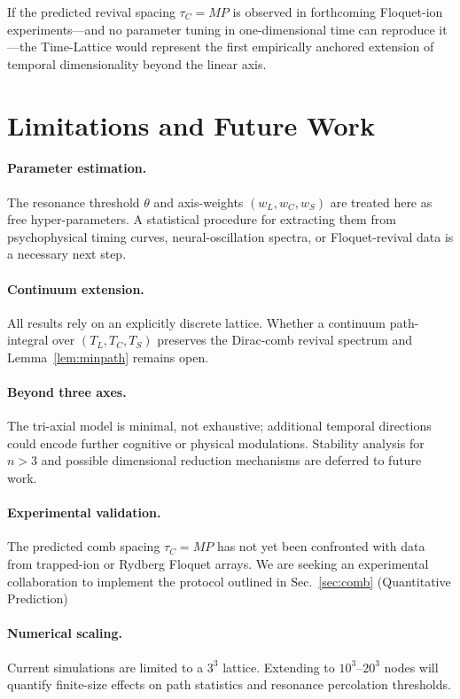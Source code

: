 \documentclass[11pt]{article}
\begin{document}
If the predicted revival spacing $\tau_C=MP$ is observed in forthcoming
Floquet-ion experiments—and no parameter tuning in one-dimensional time
can reproduce it—the Time-Lattice would represent the first empirically
anchored extension of temporal dimensionality beyond the linear axis.

\section{Limitations and Future Work}\label{sec:limits}

\paragraph{Parameter estimation.}
The resonance threshold $\theta$ and axis-weights $(w_L,w_C,w_S)$ are
treated here as free hyper-parameters.  A statistical procedure for
extracting them from psychophysical timing curves, neural-oscillation
spectra, or Floquet-revival data is a necessary next step.

\paragraph{Continuum extension.}
All results rely on an explicitly discrete lattice.
Whether a continuum path-integral over $(T_L,T_C,T_S)$ preserves the
Dirac-comb revival spectrum and Lemma~\ref{lem:minpath} remains open.

\paragraph{Beyond three axes.}
The tri-axial model is minimal, not exhaustive; additional temporal
directions could encode further cognitive or physical modulations.
Stability analysis for $n>3$ and possible dimensional reduction
mechanisms are deferred to future work.

\paragraph{Experimental validation.}
The predicted comb spacing $\tau_C=MP$ has not yet been confronted with
data from trapped-ion or Rydberg Floquet arrays. We are seeking an
experimental collaboration to implement the protocol outlined in Sec.~\ref{sec:comb} (Quantitative Prediction)

\paragraph{Numerical scaling.}
Current simulations are limited to a $3^3$ lattice.
Extending to $10^3$–$20^3$ nodes will quantify finite-size effects on
path statistics and resonance percolation thresholds.
\end{document}
